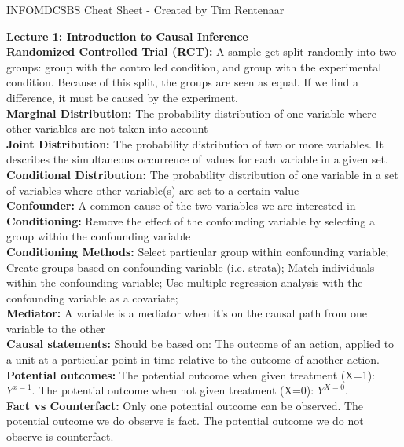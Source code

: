 \documentclass[a4paper,7pt,landscape]{extarticle}
\begin{document}
\begin{multicols}{3} %
\fontsize{6.2pt}{1pt}\selectfont

INFOMDCSBS Cheat Sheet - Created by Tim Rentenaar

\begin{boxA}
\underline{\textbf{Lecture 1: Introduction to Causal Inference}}\\
\textbf{Randomized Controlled Trial (RCT):} A sample get split randomly into two groups: group with the controlled condition, and group with the experimental condition. Because of this split, the groups are seen as equal. If we find a difference, it must be caused by the experiment.\\
\textbf{Marginal Distribution:} The probability distribution of one variable where other variables are not taken into account\\
\textbf{Joint Distribution:} The probability distribution of two or more variables. It describes the simultaneous occurrence of values for each variable in a given set.\\
\textbf{Conditional Distribution:} The probability distribution of one variable in a set of variables where other variable(s) are set to a certain value\\
\textbf{Confounder:} A common cause of the two variables we are interested in\\
\textbf{Conditioning:} Remove the effect of the confounding variable by selecting a group within the confounding variable\\
\textbf{Conditioning Methods:} Select particular group within confounding variable; Create groups based on confounding variable (i.e. strata); Match individuals within the confounding variable; Use multiple regression analysis with the confounding variable as a covariate;\\
\textbf{Mediator:} A variable is a mediator when it's on the causal path from one variable to the other\\
\textbf{Causal statements:} Should be based on: The outcome of an action, applied to a unit at a particular point in time relative to the outcome of another action.\\
\textbf{Potential outcomes:} The potential outcome when given treatment (X=1): $Y^{x=1}$. The potential outcome when not given treatment (X=0): $Y^{X=0}$.\\
\textbf{Fact vs Counterfact:} Only one potential outcome can be observed. The potential outcome we do observe is fact. The potential outcome we do not observe is counterfact.\\

\end{boxA}
\end{multicols}
\end{document}

